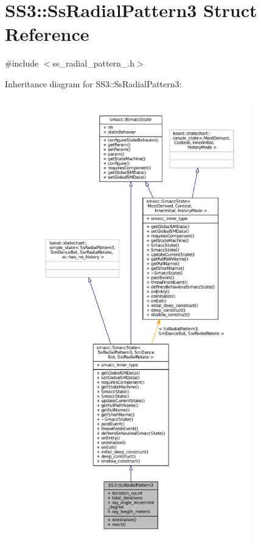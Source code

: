 \hypertarget{structSS3_1_1SsRadialPattern3}{}\section{S\+S3\+:\+:Ss\+Radial\+Pattern3 Struct Reference}
\label{structSS3_1_1SsRadialPattern3}


{\ttfamily \#include $<$ss\+\_\+radial\+\_\+pattern\+\_.\+h$>$}



Inheritance diagram for S\+S3\+:\+:Ss\+Radial\+Pattern3\+:
\nopagebreak
\begin{figure}[H]
\begin{center}
\leavevmode
\includegraphics[height=550pt]{structSS3_1_1SsRadialPattern3__inherit__graph}
\end{center}
\end{figure}


